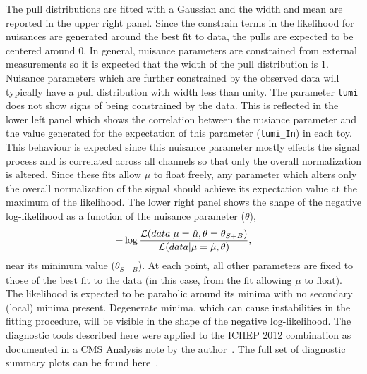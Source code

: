 The pull distributions are fitted with a Gaussian and the width and mean 
are reported in the upper right panel. Since the constrain terms in the 
likelihood for nuisances are generated around the best fit to data, 
the pulls are expected to be centered around 0.
In general, nuisance parameters
are constrained from external measurements so it is expected that the 
width of the pull distribution is 1. Nuisance parameters which are further
constrained by the observed data will typically have a pull distribution with width less
than unity. The parameter \texttt{lumi} does not show signs of being constrained
by the data. 
This is reflected in the lower left panel which shows the correlation between
the nusiance parameter and the value generated for the expectation
of this parameter (\texttt{lumi\_In}) in each toy.
This behaviour is expected since this nuisance parameter mostly effects the signal process and 
is correlated across all channels so that only the overall
normalization is altered. Since these fits allow $\mu$ to float freely, 
any parameter which alters only the overall normalization of the signal should achieve its 
expectation value at the maximum of the likelihood. 
The lower right panel shows the shape of the negative log-likelihood
as a function of the nuisance parameter ($\theta$),
\begin{equation}
-\log \frac{\displaystyle \mathcal{L}(data|\mu=\hat{\mu},\theta=\theta_{S+B})}
		 {\displaystyle \mathcal{L}(data|\mu=\hat{\mu},\theta)},
\end{equation}
near its minimum value ($\theta_{S+B}$).
At each point, all other parameters are fixed 
to those of the best fit to the data (in this case, from the fit allowing $\mu$ to float).
The likelihood is expected to be parabolic around its minima with no secondary (local) 
minima present.
Degenerate minima, which can cause instabilities in the fitting procedure, will be visible in the 
shape of the negative log-likelihood. The diagnostic tools described here were applied
to the ICHEP 2012 combination as documented in a CMS Analysis note by the 
author~\cite{diagnostics}. The full set of diagnostic summary plots can be found 
here~\cite{onlinediag}.


